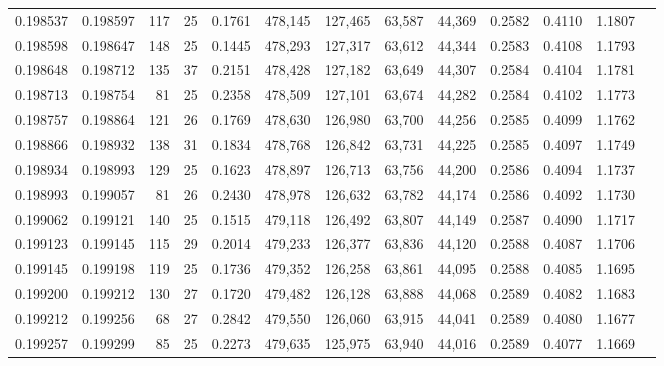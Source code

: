 \begin{tabular}{rrrrrrrrrrrrr}
0.198537 & 0.198597 & 117 &  25 &                                     0.1761 & 478,145 & 127,465 &  63,587 &  44,369 & 0.2582 & 0.4110 & 1.1807 \\
0.198598 & 0.198647 & 148 &  25 &                                     0.1445 & 478,293 & 127,317 &  63,612 &  44,344 & 0.2583 & 0.4108 & 1.1793 \\
0.198648 & 0.198712 & 135 &  37 &                                     0.2151 & 478,428 & 127,182 &  63,649 &  44,307 & 0.2584 & 0.4104 & 1.1781 \\
0.198713 & 0.198754 &  81 &  25 &                                     0.2358 & 478,509 & 127,101 &  63,674 &  44,282 & 0.2584 & 0.4102 & 1.1773 \\
0.198757 & 0.198864 & 121 &  26 &                                     0.1769 & 478,630 & 126,980 &  63,700 &  44,256 & 0.2585 & 0.4099 & 1.1762 \\
0.198866 & 0.198932 & 138 &  31 &                                     0.1834 & 478,768 & 126,842 &  63,731 &  44,225 & 0.2585 & 0.4097 & 1.1749 \\
0.198934 & 0.198993 & 129 &  25 &                                     0.1623 & 478,897 & 126,713 &  63,756 &  44,200 & 0.2586 & 0.4094 & 1.1737 \\
0.198993 & 0.199057 &  81 &  26 &                                     0.2430 & 478,978 & 126,632 &  63,782 &  44,174 & 0.2586 & 0.4092 & 1.1730 \\
0.199062 & 0.199121 & 140 &  25 &                                     0.1515 & 479,118 & 126,492 &  63,807 &  44,149 & 0.2587 & 0.4090 & 1.1717 \\
0.199123 & 0.199145 & 115 &  29 &                                     0.2014 & 479,233 & 126,377 &  63,836 &  44,120 & 0.2588 & 0.4087 & 1.1706 \\
0.199145 & 0.199198 & 119 &  25 &                                     0.1736 & 479,352 & 126,258 &  63,861 &  44,095 & 0.2588 & 0.4085 & 1.1695 \\
0.199200 & 0.199212 & 130 &  27 &                                     0.1720 & 479,482 & 126,128 &  63,888 &  44,068 & 0.2589 & 0.4082 & 1.1683 \\
0.199212 & 0.199256 &  68 &  27 &                                     0.2842 & 479,550 & 126,060 &  63,915 &  44,041 & 0.2589 & 0.4080 & 1.1677 \\
0.199257 & 0.199299 &  85 &  25 &                                     0.2273 & 479,635 & 125,975 &  63,940 &  44,016 & 0.2589 & 0.4077 & 1.1669 \\

\end{tabular}
